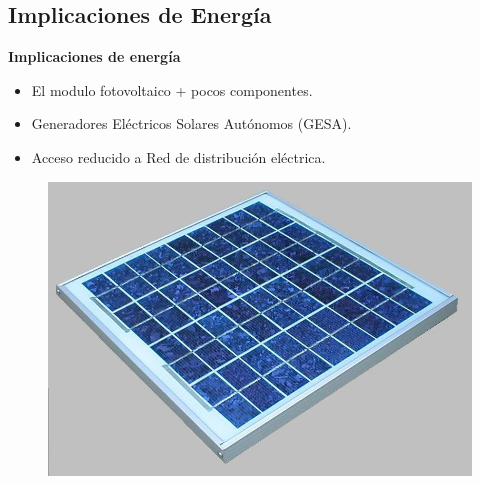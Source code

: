 \documentclass[aspectratio=43, handout]{beamer}
\begin{document}
\subsection[Energía]{Implicaciones de Energía}
\begin{frame}{\textbf{\LARGE{Implicaciones de energía}}} 
\fontsize{15pt}{15}\selectfont
\begin{minipage}[c]{1.0\linewidth}
	\begin{minipage}[c]{0.55\linewidth}
		\begin{itemize}
			\item El modulo fotovoltaico + pocos componentes.
					\vspace{10px}
			\item Generadores Eléctricos Solares Autónomos (GESA).
					\vspace{10px}
			\item Acceso reducido a Red de distribución eléctrica.
					\vspace{10px}
		\end{itemize}

\end{minipage}
	\begin{minipage}[c]{0.40\linewidth}
		\begin{figure}[H]			
		\includegraphics[width=1.2\textwidth]{./imagenes/ks10t.jpg}
		\end{figure}	  	  	
	\end{minipage}
\end{minipage}
\end{frame}
\end{document}
